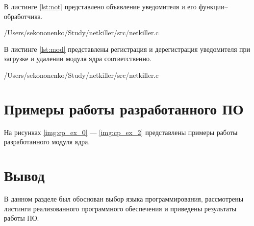 В листинге \ref{lst:not} представлено объявление уведомителя и его функции--обработчика.

\begin{lstinputlisting}[
	caption={Уведомитель для USB--устройств},
	label={lst:not},
	style={c},
	linerange={168-190},
	]{/Users/sekononenko/Study/netkiller/src/netkiller.c}
\end{lstinputlisting}

В листинге \ref{lst:mod} представлены регистрация и дерегистрация уведомителя при загрузке и удалении модуля ядра соответственно.

\begin{lstinputlisting}[
	caption={Регистрация и дерегистрация уведомителя},
	label={lst:not},
	style={c},
	linerange={192-205},
	]{/Users/sekononenko/Study/netkiller/src/netkiller.c}
\end{lstinputlisting}

\section{Примеры работы разработанного ПО}

На рисунках \ref{img:cp_ex_0} --- \ref{img:cp_ex_2} представлены примеры работы разработанного модуля ядра.




\section*{Вывод}

В данном разделе был обоснован выбор языка программирования, рассмотрены листинги реализованного программного обеспечения и приведены результаты работы ПО.
